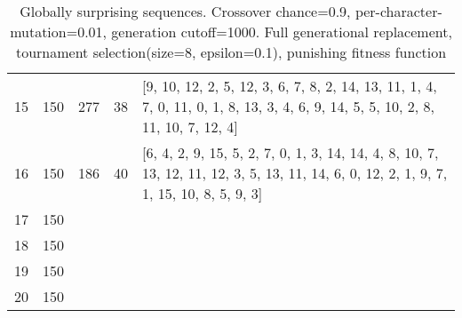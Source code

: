 \begin{table}[H]
\begin{tabularx}{\textwidth}{ l l l l X }
15 & 150 & 277 & 38 & [9, 10, 12, 2, 5, 12, 3, 6, 7, 8, 2, 14, 13, 11, 1, 4, 7, 0, 11, 0, 1, 8, 13, 3, 4, 6, 9, 14, 5, 5, 10, 2, 8, 11, 10, 7, 12, 4] \\

16 & 150 & 186 & 40 & [6, 4, 2, 9, 15, 5, 2, 7, 0, 1, 3, 14, 14, 4, 8, 10, 7, 13, 12, 11, 12, 3, 5, 13, 11, 14, 6, 0, 12, 2, 1, 9, 7, 1, 15, 10, 8, 5, 9, 3] \\

17 & 150 \\

18 & 150 \\

19 & 150 \\

20 & 150 \\

\hline

\end{tabularx}
\caption{Globally surprising sequences. Crossover chance=0.9, per-character-mutation=0.01, generation cutoff=1000. Full generational replacement, tournament selection(size=8, epsilon=0.1), punishing fitness function}
\end{table}
